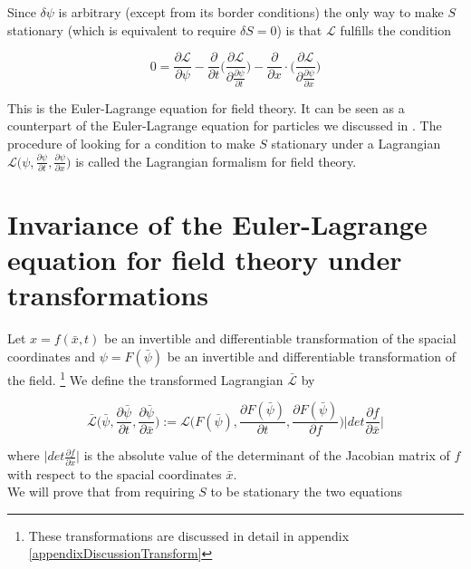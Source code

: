 \documentclass{article}
\begin{document}
Since $\delta \psi$ is arbitrary (except from its border conditions) the only way to make $S$ stationary (which is equivalent to require $\delta S = 0$) is that $\mathcal{L}$ fulfills the condition


\begin{equation}
0 = \frac{\partial \mathcal{L}}{\partial \psi}
-\frac{\partial}{\partial t} \bigg( \frac{\partial \mathcal{L}}{\partial \frac{\partial \psi}{\partial t}} \bigg) 
-\frac{\partial}{\partial x} \cdot \bigg( \frac{\partial \mathcal{L}}{\partial \frac{\partial \psi}{\partial x}} \bigg) 
\end{equation}

This is the Euler-Lagrange equation for field theory. It can be seen as a counterpart of the Euler-Lagrange equation for particles we discussed in \cite{WagnerGuthrie}. The procedure of looking for a condition to make $S$ stationary under a Lagrangian $\mathcal{L}\bigg(\psi, \frac{\partial \psi}{\partial t}, \frac{\partial \psi}{\partial x}\bigg)$ is called the Lagrangian formalism for field theory.

\section{Invariance of the Euler-Lagrange equation for field theory under transformations} \label{sectionInvariance}

Let $x=f(\bar{x},t)$ be an invertible and differentiable transformation of the spacial coordinates and $\psi=F(\bar{\psi})$ be an invertible and differentiable transformation of the field.
\footnote{These transformations are discussed in detail in appendix \ref{appendixDiscussionTransform}}
We define the transformed Lagrangian  $\bar{\mathcal{L}}$ by

\begin{equation} \label{LagrTransform}
\bar{\mathcal{L}}\bigg(\bar{\psi}, \frac{\partial \bar{\psi}}{\partial t}, \frac{\partial \bar{\psi}}{\partial \bar{x}}\bigg) 
:= \mathcal{L}\bigg(F(\bar{\psi}), \frac{\partial F(\bar{\psi})}{\partial t}, \frac{\partial F(\bar{\psi})}{\partial f}\bigg) 
\bigg| det \frac{\partial f}{\partial \bar{x}} \bigg|
\end{equation}

where $\bigg| det \frac{\partial f}{\partial \bar{x}} \bigg|$ is the absolute value of the determinant of the Jacobian matrix of $f$ with respect to the spacial coordinates $\bar{x}$. \\

We will prove that from requiring $S$ to be stationary the two equations
\end{document}
